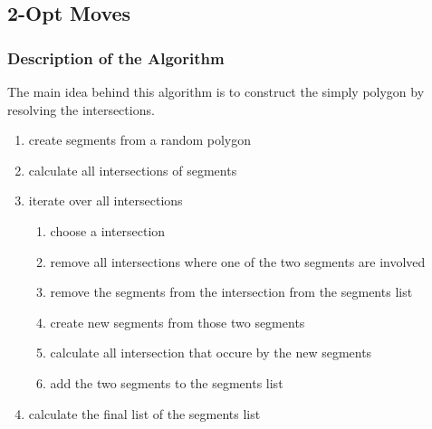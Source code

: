 \subsection{2-Opt Moves}
\subsubsection{Description of the Algorithm}
The main idea behind this algorithm is to construct the simply polygon
by resolving the intersections.

\begin{enumerate}
  \item create segments from a random polygon
  \item calculate all intersections of segments
  \item iterate over all intersections
	\begin{enumerate}
    \item choose a intersection
    \item remove all intersections where one of the two segments are
      involved
    \item remove the segments from the intersection from the segments
      list
    \item create new segments from those two segments
    \item calculate all intersection that occure by the new segments
    \item add the two segments to the segments list
  \end{enumerate}
  \item calculate the final list of the segments list
\end{enumerate}

